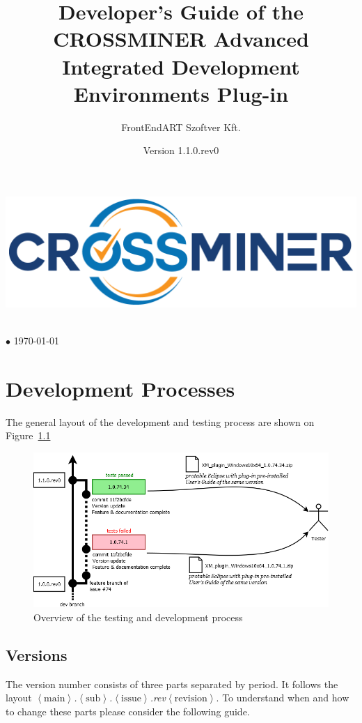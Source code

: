\documentclass[11pt,a4paper]{book}
\author{FrontEndART Szoftver Kft.}
\title{Developer's Guide of the CROSSMINER Advanced Integrated Development Environments Plug-in}
\date{Version 1.1.0.rev0}
\makeatletter
\renewcommand{\maketitle}{
\vspace*{.1\textheight}
\begin{center}
	\includegraphics[width=.6\textwidth]{pic/CROSSMINER-logo-large.png}
\end{center}
\begin{center}
	\Huge\@title
\end{center}
\vfill
\begin{center}
	\large\@author\\\@date{} $\bullet$ \today
\end{center}
}
\newcommand{\placeholder}[1]{$\left\langle\text{#1}\right\rangle$}
\makeatother
\begin{document}
	
\begin{titlepage}
	\maketitle
\end{titlepage}

\chapter{Development Processes}

The general layout of the development and testing process are shown on Figure~\ref{fig:version}

\begin{figure}[h]
	\centering
	\includegraphics[width=\linewidth]{pic/version.png}
	\caption{Overview of the testing and development process}
	\label{fig:version}
\end{figure}


\section{Versions}
The version number consists of three parts separated by period. It follows the layout \emph{\placeholder{main}.\placeholder{sub}.\placeholder{issue}.rev\placeholder{revision}}. To understand when and how to change these parts please consider the following guide.
\end{document}
